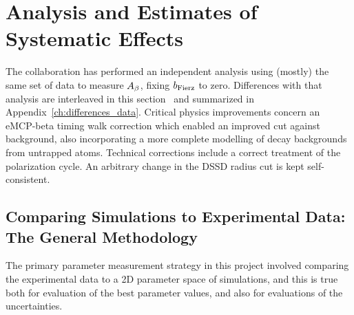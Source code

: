 


\clearpage	
\chapter{Analysis and Estimates of Systematic Effects}
\label{systematics_chapter}
\label{analysis_chapter} 

The collaboration has performed an independent analysis using (mostly) the same set of data to measure $A_{\beta}$, fixing $b_{\mathrm{Fierz}}$ to zero.
Differences with that analysis are interleaved in this section~ and summarized in Appendix~\ref{ch:differences_data}.
Critical physics improvements concern an eMCP-beta timing walk correction which enabled an improved cut against background, also incorporating a more complete modelling of decay backgrounds from untrapped atoms. Technical corrections include a correct treatment of the polarization cycle.
An arbitrary change in the DSSD
radius cut is kept self-consistent.




\FloatBarrier
\section{Comparing Simulations to Experimental Data:  The General Methodology}
\label{sec:comparing_data_sims}
The primary parameter measurement strategy in this project involved comparing the experimental data to a 2D parameter space of simulations, and this is true both for evaluation of the best parameter values, and also for evaluations of the uncertainties.  

